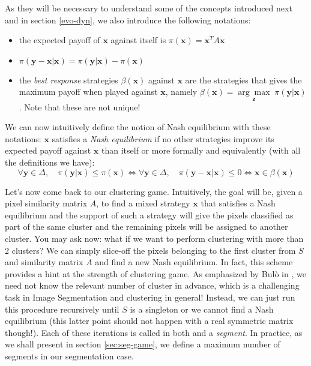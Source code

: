 \documentclass[11pt,a4paper]{article}
\begin{document}
As they will be necessary to understand some of the concepts introduced next and in section \ref{evo-dyn}, we also introduce the following notations:
\begin{itemize}
    \item the expected payoff of $\mathbf{x}$ against itself is $\pi(\mathbf{x})=\mathbf{x}^TA\mathbf{x}$
    \item $\pi(\mathbf{y}-\mathbf{x}|\mathbf{x}) = \pi(\mathbf{y}|\mathbf{x}) - \pi(\mathbf{x})$
    \item the \textit{best response} strategies $\beta(\mathbf{x})$ against $\mathbf{x}$ are the strategies that gives the maximum payoff when played against $\mathbf{x}$, namely $\beta(\mathbf{x})=\underset{\mathbf{z}}{\arg\max}\;\pi(\mathbf{y}|\mathbf{x})$. Note that these are not unique!
\end{itemize}

We can now intuitively define the notion of Nash equilibrium with these notations: $\mathbf{x}$ satisfies a \textit{Nash equilibrium} if no other strategies improve its expected payoff against $\mathbf{x}$ than itself or more formally and equivalently (with all the definitions we have):
\begin{equation}
    \forall \mathbf{y}\in\Delta,\quad  \pi(\mathbf{y}|\mathbf{x}) \leq \pi(\mathbf{x}) \iff \forall \mathbf{y}\in\Delta,\quad  \pi(\mathbf{y} - \mathbf{x}|\mathbf{x}) \leq 0 \iff \mathbf{x} \in \beta(\mathbf{x})
\end{equation}

Let's now come back to our clustering game. Intuitively, the goal will be, given a pixel similarity matrix $A$, to find a mixed strategy $\mathbf{x}$ that satisfies a Nash equilibrium and the support of such a strategy will give the pixels classified as part of the same cluster and the remaining pixels will be assigned to another cluster. You may ask now: what if we want to perform clustering with more than 2 clusters? We can simply slice-off the pixels belonging to the first cluster from $S$ and similarity matrix $A$ and find a new Nash equilibrium. In fact, this scheme provides a hint at the strength of clustering game. As emphasized by Bulò in \cite{bulo-thesis}, we need not know the relevant number of cluster in advance, which is a challenging task in Image Segmentation and clustering in general! Instead, we can just run this procedure recursively until $S$ is a singleton or we cannot find a Nash equilibrium (this latter point should not happen with a real symmetric matrix though!). Each of these iterations is called in both \cite{bulo-thesis} and \cite{game-clustering} a \textit{segment}. In practice, as we shall present in section \ref{sec:seg-game}, we define a maximum number of segments in our segmentation case.
\end{document}
